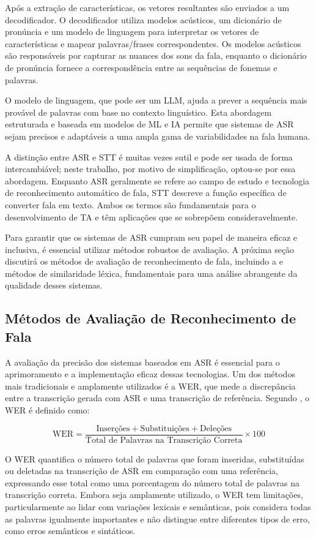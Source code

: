 Após a extração de características, os vetores resultantes são enviados a um decodificador. O decodificador utiliza modelos acústicos, um dicionário de pronúncia e um modelo de linguagem para interpretar os vetores de características e mapear palavras/frases correspondentes. Os modelos acústicos são responsáveis por capturar as nuances dos sons da fala, enquanto o dicionário de pronúncia fornece a correspondência entre as sequências de fonemas e palavras.

O modelo de linguagem, que pode ser um LLM, ajuda a prever a sequência mais provável de palavras com base no contexto linguístico. Esta abordagem estruturada e baseada em modelos de ML e IA permite que sistemas de ASR sejam precisos e adaptáveis a uma ampla gama de variabilidades na fala humana.

A distinção entre ASR e STT é muitas vezes sutil e pode ser usada de forma intercambiável; neste trabalho, por motivo de simplificação, optou-se por essa abordagem. Enquanto ASR geralmente se refere ao campo de estudo e tecnologia de reconhecimento automático de fala, STT descreve a função específica de converter fala em texto. Ambos os termos são fundamentais para o desenvolvimento de TA e têm aplicações que se sobrepõem consideravelmente.

Para garantir que os sistemas de ASR cumpram seu papel de maneira eficaz e inclusiva, é essencial utilizar métodos robustos de avaliação. A próxima seção discutirá os métodos de avaliação de reconhecimento de fala, incluindo a  e métodos de similaridade léxica, fundamentais para uma análise abrangente da qualidade desses sistemas.

\subsection{Métodos de Avaliação de Reconhecimento de Fala}

A avaliação da precisão dos sistemas baseados em ASR é essencial para o aprimoramento e a implementação eficaz dessas tecnologias. Um dos métodos mais tradicionais e amplamente utilizados é a WER, que mede a discrepância entre a transcrição gerada com ASR e uma transcrição de referência. Segundo , o WER é definido como:

\[
\text{WER} = \frac{\text{Inserções} + \text{Substituições} + \text{Deleções}}{\text{Total de Palavras na Transcrição Correta}} \times 100
\]

O WER quantifica o número total de palavras que foram inseridas, substituídas ou deletadas na transcrição de ASR em comparação com uma referência, expressando esse total como uma porcentagem do número total de palavras na transcrição correta. Embora seja amplamente utilizado, o WER tem limitações, particularmente ao lidar com variações lexicais e semânticas, pois considera todas as palavras igualmente importantes e não distingue entre diferentes tipos de erro, como erros semânticos e sintáticos.

